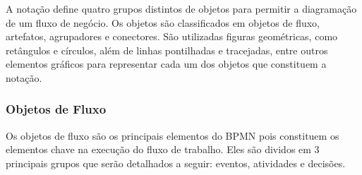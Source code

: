 A notação define quatro grupos distintos de objetos para permitir a diagramação de um fluxo de negócio. Os objetos são classificados em objetos de fluxo, artefatos, agrupadores e conectores. São utilizadas figuras geométricas, como retângulos e círculos, além de linhas pontilhadas e tracejadas, entre outros elementos gráficos para representar cada um dos objetos que constituem a notação.

\subsubsection{Objetos de Fluxo}\label{sec:bpm-bpmn_objetos_fluxo}

Os objetos de fluxo são os principais elementos do BPMN pois constituem os elementos chave na execução do fluxo de trabalho. Eles são dividos em 3 principais grupos que serão detalhados a seguir: eventos, atividades e decisões.


